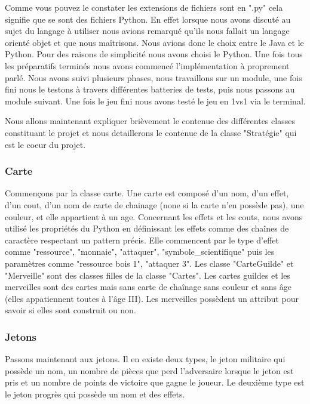 \documentclass[a4paper, 12pt, french]{article}
\begin{document}
	Comme vous pouvez le constater les extensions de fichiers sont en ".py" cela signifie que se sont des fichiers
	Python. En effet lorsque nous avons discuté au sujet du langage à utiliser nous avions remarqué qu'ils nous fallait un
	langage orienté objet et que nous maîtrisons. Nous avions donc le choix entre le Java et le Python.
	Pour des raisons de simplicité nous avons choisi le Python. Une fois tous les préparatifs terminés nous avons
	commencé l'implémentation à proprement parlé. Nous avons suivi plusieurs phases, nous travaillons sur
	un module, une fois fini nous le testons à travers différentes batteries de tests, puis nous passons
	au module suivant. Une fois le jeu fini nous avons testé le jeu en 1vs1 via le terminal.

	Nous allons maintenant expliquer brièvement le contenue des différentes classes 
	constituant le projet et nous detaillerons le contenue de la classe "Stratégie" qui 
	est le coeur du projet.

	\subsubsection{Carte}
		Commençons par la classe carte.
		Une carte est composé d'un nom, d'un effet, d'un cout, d'un nom de carte de chainage (none si la carte n'en possède
		pas), une couleur, et elle appartient à un age.
		Concernant les effets et les couts, nous avons utilisé les propriétés du Python en définissant les effets
		comme des chaînes de caractère respectant un pattern précis. Elle commencent par le type d'effet
		comme "ressource", "monnaie", "attaquer", "symbole\_scientifique" puis les paramètres comme
		"ressource bois 1", "attaquer 3".
		Les classe "CarteGuilde" et "Merveille" sont des classes filles de la classe "Cartes". Les cartes guildes
		et les merveilles sont des cartes
		mais sans carte de chaînage sans couleur et sans âge (elles appatiennent toutes à l'âge III). Les merveilles
		possèdent un attribut pour savoir si elles sont construit ou non.

	\subsubsection{Jetons}
		Passons maintenant aux jetons. Il en existe deux types, le jeton militaire qui possède un nom, un nombre de pièces
		que perd l'adversaire lorsque le jeton est pris et un nombre de points de victoire que gagne le joueur.
		Le deuxième type est le jeton progrès qui possède un nom et des effets.
\end{document}
